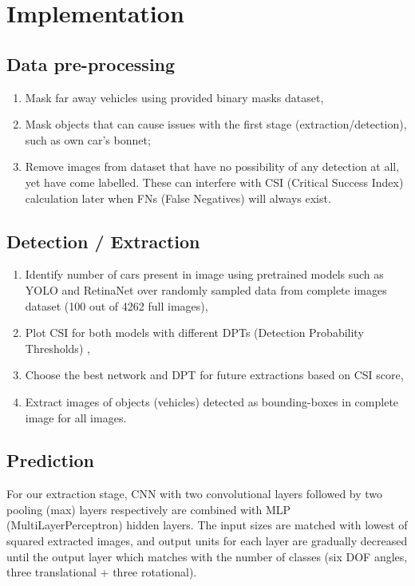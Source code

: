 \chapter{Implementation}
\label{chap:impl}

\section{Data pre-processing}

\begin{enumerate}
    \item Mask far away vehicles using provided binary masks dataset,
    \item Mask objects that can cause issues with the first stage (extraction/detection), such as own car’s bonnet;
    \item Remove images from dataset that have no possibility of any detection at all, yet have come labelled. These can interfere with CSI (Critical Success Index) calculation later when FNs (False Negatives) will always exist.
\end{enumerate}



\section{Detection / Extraction}

\begin{enumerate}
    \item Identify number of cars present in image using pretrained models such as YOLO and RetinaNet over randomly sampled data from complete images dataset (100 out of 4262 full images), 
    \item Plot CSI for both models with different DPTs (Detection Probability Thresholds) \parencite{schaefer1990criticalSuccessIndex}, 
    \item Choose the best network and DPT for future extractions based on CSI score,
    \item Extract images of objects (vehicles) detected as bounding-boxes in complete image for all images.
\end{enumerate}




\section{Prediction}

For our extraction stage, CNN with two convolutional layers followed by two pooling (max) layers respectively are combined with MLP (MultiLayerPerceptron) hidden layers. The input sizes are matched with lowest of squared extracted images, and output units for each layer are gradually decreased until the output layer which matches with the number of classes (six DOF angles, three translational + three rotational).

